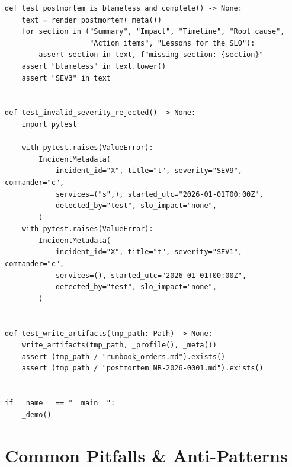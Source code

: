 \begin{verbatim}
def test_postmortem_is_blameless_and_complete() -> None:
    text = render_postmortem(_meta())
    for section in ("Summary", "Impact", "Timeline", "Root cause",
                    "Action items", "Lessons for the SLO"):
        assert section in text, f"missing section: {section}"
    assert "blameless" in text.lower()
    assert "SEV3" in text


def test_invalid_severity_rejected() -> None:
    import pytest

    with pytest.raises(ValueError):
        IncidentMetadata(
            incident_id="X", title="t", severity="SEV9", commander="c",
            services=("s",), started_utc="2026-01-01T00:00Z",
            detected_by="test", slo_impact="none",
        )
    with pytest.raises(ValueError):
        IncidentMetadata(
            incident_id="X", title="t", severity="SEV1", commander="c",
            services=(), started_utc="2026-01-01T00:00Z",
            detected_by="test", slo_impact="none",
        )


def test_write_artifacts(tmp_path: Path) -> None:
    write_artifacts(tmp_path, _profile(), _meta())
    assert (tmp_path / "runbook_orders.md").exists()
    assert (tmp_path / "postmortem_NR-2026-0001.md").exists()


if __name__ == "__main__":
    _demo()
\end{verbatim}
\section{Common Pitfalls \& Anti-Patterns}
\label{sec:ch18-pitfalls}

